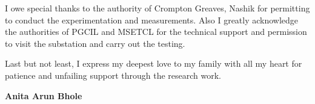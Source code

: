 I owe special thanks to the authority of Crompton Greaves, Nashik for permitting to conduct the experimentation and measurements. Also I greatly acknowledge the authorities of PGCIL and MSETCL for the technical support and permission to visit the substation and carry out the testing.

Last but not least, I express my deepest love to my family with all my heart for patience and unfailing support through the research work.

\setlength{\parskip}{0em}
\vspace{2cm}
\begin{flushright}
\textbf{Anita Arun Bhole}
\end{flushright}
\clearpage